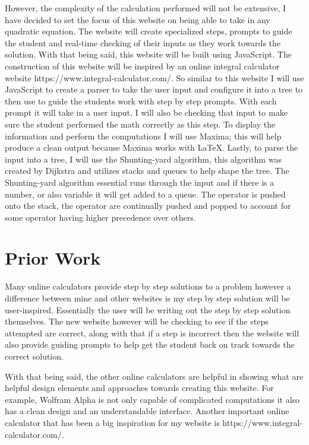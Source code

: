 \documentclass[10pt,twocolumn]{article}
\begin{document}
However, the complexity of the calculation performed will not be extensive, I have decided to set the focus of this website on being able to take in any quadratic equation. The website will create specialized steps, prompts to guide the student and real-time checking of their inputs as they work towards the solution. With that being said, this website will be built using JavaScript. The construction of this website will be inspired by an online integral calculator website https://www.integral-calculator.com/. So similar to this website I will use JavaScript to create a parser to take the user input and configure it into a tree to then use to guide the students work with step by step prompts. With each prompt it will take in a user input, I will also be checking that input to make sure the student performed the math correctly as this step. To display the information and perform the computations I will use Maxima; this will help produce a clean output because Maxima works with \LaTeX. Lastly, to parse the input into a tree, I will use the Shunting-yard algorithm, this algorithm was created by Dijkstra  and utilizes stacks and queues to help shape the tree. The Shunting-yard algorithm essential runs through the input and if there is a number, or also variable it will get added to a queue. The operator is pushed onto the stack, the operator are continually pushed and popped to account for some operator having higher precedence over others. \cite{noauthor_shunting-yard_2022} 

\section{Prior Work}
Many online calculators provide step by step solutions to a problem however a difference between mine and other websites is my step by step solution will be user-inspired. Essentially the user will be writing out the step by step solution themselves. The new website however will be checking to see if the steps attempted are correct, along with that if a step is incorrect then the website will also provide guiding prompts to help get the student back on track towards the correct solution. 

With that being said, the other online calculators are helpful in showing what are helpful design elements and approaches towards creating this website. For example, Wolfram Alpha is not only capable of complicated computations it also has a clean design and an understandable interface. Another important online calculator that has been a big inspiration for my website is https://www.integral-calculator.com/. 
\end{document}
